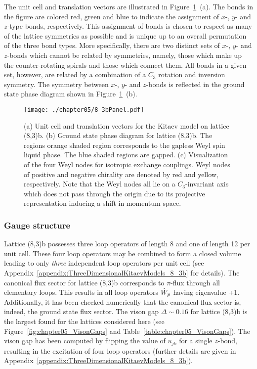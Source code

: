 The unit cell and translation vectors are illustrated in Figure~\ref{fig:chapter05_8_3bPanel}~(a).
The bonds in the figure are colored red, green and blue to indicate the assignment of $x$-, $y$- and $z$-type bonds, respectively.
This assignment of bonds is chosen to respect as many of the lattice symmetries as possible and is unique up to an overall permutation of the three bond types.
More specifically, there are two distinct sets of $x$-, $y$- and $z$-bonds which cannot be related by symmetries, namely, those which make up the counter-rotating spirals and those which connect them.
All bonds in a given set, however, are related by a combination of a $C_3$ rotation and inversion symmetry.
The symmetry between $x$-, $y$- and $z$-bonds is reflected in the ground state phase diagram shown in Figure~\ref{fig:chapter05_8_3bPanel}~(b).
%
\begin{figure}[tb]
	\centering
	\texttt{[image: ./chapter05/8\_3bPanel.pdf]}
	\caption{
		(a) Unit cell and translation vectors for the Kitaev model on lattice (8,3)b.
		(b) Ground state phase diagram for lattice (8,3)b.
		The regions orange shaded region corresponds to the gapless Weyl spin liquid phase.
		The blue shaded regions are gapped.
		(c) Visualization of the four Weyl nodes for isotropic exchange couplings.
		Weyl nodes of positive and negative chirality are denoted by red and yellow, respectively.
		Note that the Weyl nodes all lie on a $C_3$-invariant axis which does not pass through the origin due to its projective representation inducing a shift in momentum space.
	}
	\label{fig:chapter05_8_3bPanel}
\end{figure}
%


%
%
\subsubsection{Gauge structure}
%
%
Lattice (8,3)b possesses three loop operators of length 8 and one of length 12 per unit cell.
These four loop operators may be combined to form a closed volume leading to only \textit{three} independent loop operators per unit cell (see Appendix~\ref{appendix:ThreeDimensionalKitaevModels_8_3b} for details).
The canonical flux sector for lattice (8,3)b corresponds to $\pi$-flux through all elementary loops.
This results in all loop operators $\hat{W}_p$ having eigenvalue +1.
Additionally, it has been checked numerically that the canonical flux sector is, indeed, the ground state flux sector.
The vison gap $\Delta \sim 0.16$ for lattice (8,3)b is the largest found for the lattices considered here (see Figure~\ref{fig:chapter05_VisonGaps} and Table~\ref{table:chapter05_VisonGaps}).
The vison gap has been computed by flipping the value of $u_{jk}$ for a single $z$-bond, resulting in the excitation of four loop operators (further details are given in Appendix~\ref{appendix:ThreeDimensionalKitaevModels_8_3b}).


